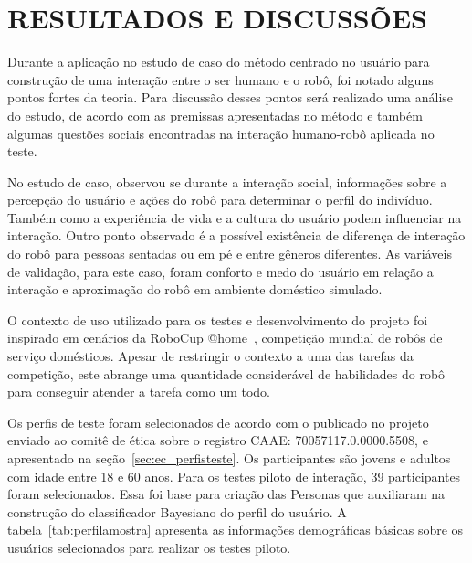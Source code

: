 \chapter{RESULTADOS E DISCUSSÕES}
\label{cap:resultados}
Durante a aplicação no estudo de caso do método centrado no usuário para construção de uma interação entre o ser humano e o robô, foi notado alguns pontos fortes da teoria. Para discussão desses pontos será realizado uma análise do estudo, de acordo com as premissas apresentadas no método e também algumas questões sociais encontradas na interação humano-robô aplicada no teste.

No estudo de caso, observou se durante a interação social, informações sobre a percepção do usuário e ações do robô para determinar o perfil do indivíduo. Também como a experiência de vida e a cultura do usuário podem influenciar na interação. Outro ponto observado é a possível existência de diferença de interação do robô para pessoas sentadas ou em pé e entre gêneros diferentes. As variáveis de validação, para este caso, foram conforto e medo do usuário em relação a interação e aproximação do robô em ambiente doméstico simulado.

O contexto de uso utilizado para os testes e desenvolvimento do projeto foi inspirado em cenários da RoboCup @home~\cite{robocup:2015}, competição mundial de robôs de serviço domésticos. Apesar de restringir o contexto a uma das tarefas da competição, este abrange uma quantidade considerável de habilidades do robô para conseguir atender a tarefa como um todo. 

Os perfis de teste foram selecionados de acordo com o publicado no projeto enviado ao comitê de ética sobre o registro CAAE: 70057117.0.0000.5508, e apresentado na seção~\ref{sec:ec_perfisteste}. Os participantes são jovens e adultos com idade entre 18 e 60 anos. Para os testes piloto de interação, 39 participantes foram selecionados. Essa foi base para criação das Personas que auxiliaram na construção do classificador Bayesiano do perfil do usuário. A tabela~\ref{tab:perfilamostra} apresenta as informações demográficas básicas sobre os usuários selecionados para realizar os testes piloto.

